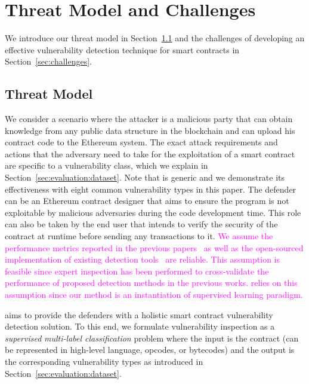 \vspace{-0.8em}%
\vspace{-0.3em}
\section{Threat Model and Challenges}  \label{sec:overview}
\vspace{-0.3em}
We introduce our threat model in Section~\ref{sec:threat} and the challenges of developing an effective vulnerability detection technique for smart contracts in Section~\ref{sec:challenges}.

\vspace{-0.5em}
\subsection{Threat Model} 
\label{sec:threat}
\vspace{-0.2em}
We consider a scenario where the attacker is a malicious party that can obtain knowledge from any public data structure in the blockchain and can upload his contract code to the Ethereum system. The exact attack requirements and actions that the adversary need to take for the exploitation of a smart contract are specific to a vulnerability class, which we explain in Section~\ref{sec:evaluation:dataset}.
Note that \sys{} is generic and we demonstrate its effectiveness with eight common vulnerability types in this paper. 
The defender can be an Ethereum contract designer that aims to ensure the program is not exploitable by malicious adversaries during the code development time. This role can also be taken by the end user that intends to verify the security of the contract at runtime before sending any transactions to it.
\textcolor{magenta}{We assume the performance metrics reported in the previous papers~\cite{ethereum-background-03,mueller2018smashing,rw_dedaub_mad_max_paper} as well as the open-sourced implementation of existing detection tools~\cite{rw_oyente_repo,rw_mythril_repo,dedaub} are reliable. This assumption is feasible since expert inspection has been performed to cross-validate the performance of proposed detection methods in the previous works. \sys{} relies on this assumption since our method is an instantiation of supervised learning paradigm.}

\sys{} aims to provide the defenders with a holistic smart contract vulnerability detection solution. To this end, we formulate vulnerability inspection as a
\textit{supervised} \textit{multi-label classification} problem where the input is the contract (can be represented in high-level language, opcodes, or bytecodes) and the output is the corresponding vulnerability types as introduced in Section~\ref{sec:evaluation:dataset}.

